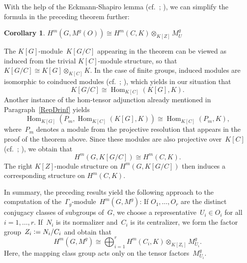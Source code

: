 \documentclass[12pt]{article}
\makeatletter
\theoremstyle{definition}
\newtheorem{Cor}[Satz]{Corollary}
\theoremstyle{break}
\renewenvironment{proof}[1][\proofname]{\par
\vspace{-5pt}%
\pushQED{\qed}%
\normalfont
\topsep0pt \partopsep0pt %
\trivlist
\item[\hskip\labelsep
\bfseries
#1\@addpunct{.}]\ignorespaces
}{%
\popQED\endtrivlist\@endpefalse
\addvspace{6pt plus 6pt} %
}
\DeclareMathOperator\Hom{Hom}
\renewcommand{\1}{\mathbbm{1}}
\newcommand{\ot}{\mathbin{\otimes}}
\newcommand{\deq}{\vcentcolon =}
\makeatother
\begin{document}
With the help of the Eckmann-Shapiro lemma (cf.~\cite[Prop.~4.1.3, p.~36]{E}; \cite[Lem.~6.3.2, p.~171]{We}), we can simplify the formula in the preceding theorem further:
\begin{Cor} \label{CorDecomp}
$H^m(G,M^g(O)) \cong H^m(C,K) \ot_{K[Z]} M_U^{g}$
\end{Cor}
\begin{proof}
The $K[G]$-module~$K[G/C]$ appearing in the theorem can be viewed as induced from the trivial $K[C]$-module structure, so that $K[G/C] \cong K[G] \ot_{K[C]} K$. In the case of finite groups, induced modules are isomorphic to coinduced modules (cf.~\cite[Prop.~4.1.2, p.~36]{E}; \cite[Lem.~6.3.4, p.~172]{We}), which yields in our situation that
\[K[G/C] \cong \Hom_{K[C]}(K[G],K).\]
Another instance of the hom-tensor adjunction already mentioned in Paragraph~\ref{RepDrinf} yields
\[\Hom_{K[G]}(P_m, \Hom_{K[C]}(K[G],K)) \cong \Hom_{K[C]}(P_m, K),\]
where~$P_m$ denotes a module from the projective resolution that appears in the proof of the theorem above. Since these modules are also projective over~$K[C]$ (cf.~\cite[p.~35]{E}; \cite[p.~172]{We}), we obtain that
\[H^m(G,K[G/C]) \cong H^m(C,K).\]
The right $K[Z]$-module structure on $H^m(G,K[G/C])$ then induces a corresponding structure on
$H^m(C,K)$.
\end{proof}

In summary, the preceding results yield the following approach to the computation
of the~$\Gamma_g$-module~$H^m(G,M^g)$: If $O_1,\dots,O_r$ are the distinct conjugacy classes of subgroups of~$G$, we choose a representative~$U_i \in O_i$ for all $i=1,\dots,r$. If~$N_i$ is its normalizer and~$C_i$ is its centralizer, we form the factor group~$Z_i \deq N_i/C_i$ and obtain that
\[H^m(G,M^g) \cong \bigoplus_{i=1}^r H^m(C_i,K) \ot_{K[Z_i]} M_{U_i}^{g}. \]
Here, the mapping class group acts only on the tensor factors~$M_{U_i}^{g}$.
\end{document}
